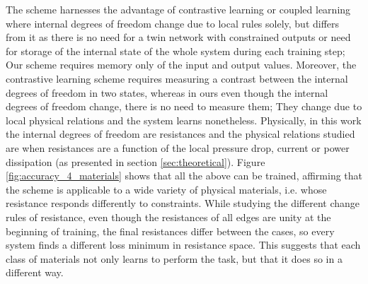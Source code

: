 \documentclass[%
 reprint,
 amsmath,amssymb,
 aps,
]{revtex4-2}
\begin{document}
{    The scheme harnesses the advantage of contrastive learning \cite{scellier2017equilibrium} or coupled learning \cite{stern2021supervised} where internal degrees of freedom change due to local rules solely, but differs from it as there is no need for a twin network with constrained outputs or need for storage of the internal state of the whole system during each training step; Our scheme requires memory only of the input and output values. 
    Moreover, the contrastive learning scheme requires measuring a contrast between the internal degrees of freedom in two states, whereas in ours even though the internal degrees of freedom change, there is no need to measure them; They change due to local physical relations and the system learns nonetheless. 
    Physically, in this work the internal degrees of freedom are resistances and the physical relations studied are when resistances are a function of the local pressure drop, current or power dissipation (as presented in section \ref{sec:theoretical}). 
    Figure \ref{fig:accuracy_4_materials} shows that all the above can be trained, affirming that the scheme is applicable to a wide variety of physical materials, i.e. whose resistance responds differently to constraints. While studying the different change rules of resistance, even though the resistances of all edges are unity at the beginning of training, the final resistances differ between the cases, so every system finds a different loss minimum in resistance space. This suggests that each class of materials not only learns to perform the task, but that it does so in a different way.

}
\end{document}
